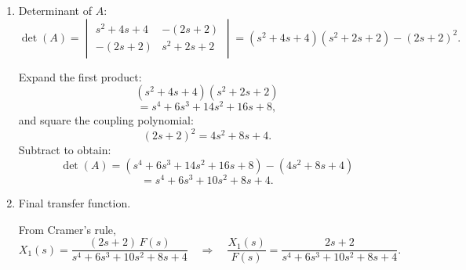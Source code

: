 \documentclass[11pt]{article}
\begin{document}
\begin{enumerate}[label=(\alph*), itemindent=*, leftmargin=*, nolistsep]
    \item Determinant of $A$:
    \[
    \det(A) =
    \begin{vmatrix}
    s^2+4s+4 & -(2s+2) \\[6pt]
    -(2s+2) & s^2+2s+2
    \end{vmatrix}
    = (s^2+4s+4)(s^2+2s+2) - (2s+2)^2.
    \]

    Expand the first product:
    \[
    (s^2+4s+4)(s^2+2s+2)
    \]
    \[
    = s^4 + 6s^3 + 14s^2 + 16s + 8,
    \]
    and square the coupling polynomial:
    \[
    (2s+2)^2 = 4s^2 + 8s + 4.
    \]
    Subtract to obtain:
    \[
    \det(A) = (s^4 + 6s^3 + 14s^2 + 16s + 8) - (4s^2 + 8s + 4)
    \]
    \[
    = s^4 + 6s^3 + 10s^2 + 8s + 4.
    \]

    \item Final transfer function.

    From Cramer's rule,
    \[
    X_1(s) = \frac{(2s+2)\,F(s)}{s^4 + 6s^3 + 10s^2 + 8s + 4}
    \quad\Rightarrow\quad
    \boxed{\displaystyle
    \frac{X_1(s)}{F(s)} = \frac{2s+2}{s^4 + 6s^3 + 10s^2 + 8s + 4}.
    }
    \]

    
\end{enumerate}

\end{document}
